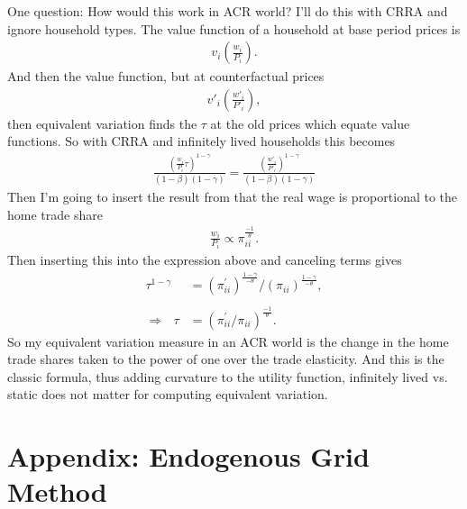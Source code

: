 \documentclass[12pt,pdftex]{article}
\begin{document}
\begin{onehalfspacing}
One question: How would this work in ACR world? I'll do this with CRRA and ignore household types. The value function of a household at base period prices is
\begin{align}
v_i\left ( \frac{w_{i}}{P_{i}} \right).
\end{align}
And then the value function, but at counterfactual prices
\begin{align}
v'_i\left( \frac{w'_{i}}{P'_{i}} \right),
\end{align}
then equivalent variation finds the $\tau$ at the old prices which equate value functions. So with CRRA and infinitely lived households this becomes
\begin{align}
\frac{\left( \frac{w_{i}}{P_{i}} \tau \right )^{1-\gamma}}{(1 - \beta)(1-\gamma)} = \frac{ \left( \frac{w'_{i}}{P'_{i}}  \right)^{1-\gamma}}{(1 - \beta)(1-\gamma)}
\end{align}
Then I'm going to insert the result from \citet{arkolakis2012new} that the real wage is proportional to the home trade share
\begin{align}
\frac{w_{i}}{P_{i}} \propto \pi_{ii}^{\frac{-1}{\theta}}.
\end{align}
Then inserting this into the expression above and canceling terms gives
\begin{align}
\tau^{1-\gamma} &= \left( \pi_{ii}^{\prime} \right)^{\frac{1-\gamma}{-\theta}} /  \left( \pi_{ii} \right)^{\frac{1-\gamma}{-\theta}}, \\
\nonumber \\
\Rightarrow \ \ \  \tau & = \left( \pi_{ii}^{\prime}  /   \pi_{ii} \right)^{\frac{-1}{\theta}}.
\end{align}
So my equivalent variation measure in an ACR world is the change in the home trade shares taken to the power of one over the trade elasticity. And this is the classic formula, thus adding curvature to the utility function, infinitely lived vs. static does not matter for computing equivalent variation.

\newpage

\section{Appendix: Endogenous Grid Method}


\end{onehalfspacing}
\end{document}
